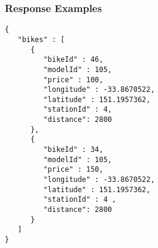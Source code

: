 \subsubsection{Response Examples}\label{response-examples}

\begin{verbatim}
{
   "bikes" : [
      {
         "bikeId" : 46,
         "modelId" : 105,
         "price" : 100,
         "longitude" : -33.8670522,
         "latitude" : 151.1957362,
         "stationId" : 4,
         "distance": 2800
      },
      {
         "bikeId" : 34,
         "modelId" : 105,
         "price" : 150,
         "longitude" : -33.8670522,
         "latitude" : 151.1957362,
         "stationId" : 4 ,
         "distance": 2800
      }
   ]
}
\end{verbatim}
